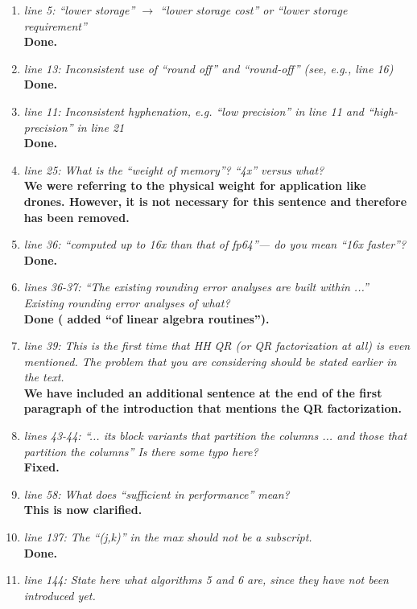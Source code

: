 \documentclass[final,onefignum,onetabnum]{siamart190516}
\begin{document}
\begin{enumerate}
    \item {\it line 5: ``lower storage'' $\rightarrow$ ``lower storage cost'' or ``lower storage requirement'' }\\
    {\bf Done.}
    \item {\it line 13: Inconsistent use of ``round off'' and ``round-off'' (see, e.g., line 16) }\\
    {\bf Done.}
    \item {\it line 11: Inconsistent hyphenation, e.g. ``low precision'' in line 11 and ``high-precision'' in line 21 }\\
    {\bf Done.}
    \item {\it line 25: What is the ``weight of memory''? ``4x'' versus what? }\\
    {\bf We were referring to the physical weight for application like drones. However, it is not necessary for this sentence and therefore has been removed. }
    \item {\it line 36: ``computed up to 16x than that of fp64''--- do you mean ``16x faster''? }\\
    {\bf Done.}
    \item {\it lines 36-37: ``The existing rounding error analyses are built within ...'' Existing rounding error analyses of what? }\\
    {\bf Done ( added ``of linear algebra routines'').}
    \item {\it line 39: This is the first time that HH QR (or QR factorization at all) is even mentioned. The problem that you are considering should be stated earlier in the text. }\\
    {\bf We have included an additional sentence at the end of the first paragraph of the introduction that mentions the QR factorization.}
    \item {\it lines 43-44: ``... its block variants that partition the columns ... and those that partition the columns'' Is there some typo here? }\\
    {\bf Fixed.}
    \item {\it line 58: What does ``sufficient in performance'' mean? }\\
    {\bf This is now clarified.}
    \item {\it line 137: The ``(j,k)'' in the max should not be a subscript. }\\
    {\bf Done.}
    \item {\it line 144: State here what algorithms 5 and 6 are, since they have not been introduced yet. }\\

\end{enumerate}
\end{document}
